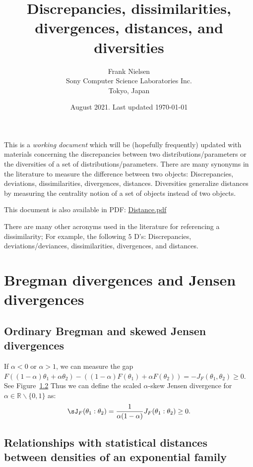 \documentclass[11pt]{article}
\title{Discrepancies, dissimilarities, divergences, distances, and diversities}
\date{August 2021. Last updated \today}
\author{Frank Nielsen\\ Sony Computer Science Laboratories Inc.\\ Tokyo, Japan}
\def\bbR{\mathbb{R}}
\begin{document}
\maketitle

This is a {\em working document} which will be (hopefully frequently) updated with materials concerning the discrepancies between two distributions/parameters or the diversities of a set of distributions/parameters.
There are many synonyms in the literature to measure the difference between two objects: 
Discrepancies, deviations, dissimilarities, divergences, distances. 
Diversities generalize distances by measuring the centrality notion of a set of objects instead of two objects.

\vskip 0.5cm
This document is also available in PDF: \url{Distance.pdf} 
\vskip 0.5cm

There are many other acronyms used in the literature for referencing a dissimilarity; For example, the following $5$ D's:
Discrepancies, deviations/deviances, dissimilarities, divergences, and distances.



\tableofcontents

\section{Bregman divergences and Jensen divergences}

\subsection{Ordinary Bregman and skewed Jensen divergences}



If $\alpha<0$ or $\alpha>1$, we can measure the gap $F((1-\alpha)\theta_1+\alpha\theta_2)-((1-\alpha) F(\theta_1)+\alpha F(\theta_2))=-J_F(\theta_1,\theta_2)\geq 0$.
See Figure~\ref{}
Thus we can define the scaled $\alpha$-skew Jensen divergence for $\alpha\in\bbR\backslash\{0,1\}$ as:
$$
\sJ_F(\theta_1:\theta_2)=\frac{1}{\alpha(1-\alpha)}J_F(\theta_1:\theta_2)\geq 0.
$$


\subsection{Relationships with statistical distances between densities of an exponential family}
\end{document}
